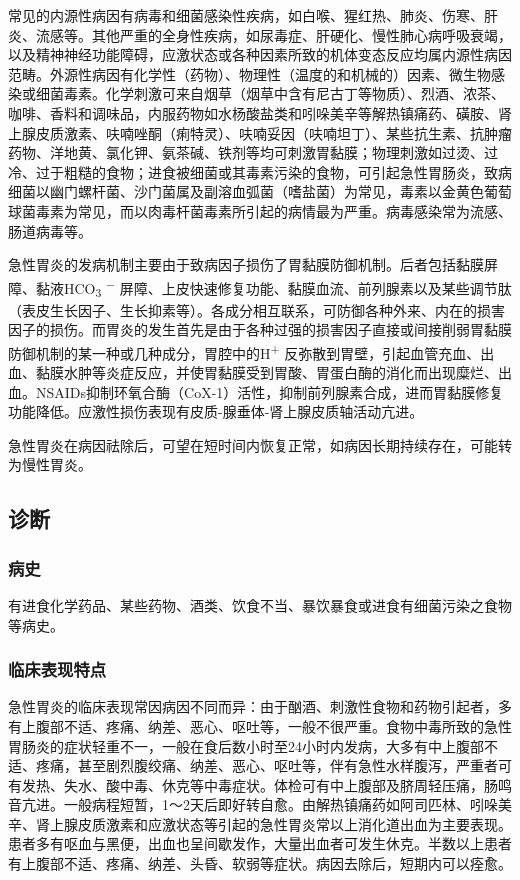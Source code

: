常见的内源性病因有病毒和细菌感染性疾病，如白喉、猩红热、肺炎、伤寒、肝炎、流感等。其他严重的全身性疾病，如尿毒症、肝硬化、慢性肺心病呼吸衰竭，以及精神神经功能障碍，应激状态或各种因素所致的机体变态反应均属内源性病因范畴。外源性病因有化学性（药物）、物理性（温度的和机械的）因素、微生物感染或细菌毒素。化学刺激可来自烟草（烟草中含有尼古丁等物质）、烈酒、浓茶、咖啡、香料和调味品，内服药物如水杨酸盐类和吲哚美辛等解热镇痛药、磺胺、肾上腺皮质激素、呋喃唑酮（痢特灵）、呋喃妥因（呋喃坦丁）、某些抗生素、抗肿瘤药物、洋地黄、氯化钾、氨茶碱、铁剂等均可刺激胃黏膜；物理刺激如过烫、过冷、过于粗糙的食物；进食被细菌或其毒素污染的食物，可引起急性胃肠炎，致病细菌以幽门螺杆菌、沙门菌属及副溶血弧菌（嗜盐菌）为常见，毒素以金黄色葡萄球菌毒素为常见，而以肉毒杆菌毒素所引起的病情最为严重。病毒感染常为流感、肠道病毒等。

急性胃炎的发病机制主要由于致病因子损伤了胃黏膜防御机制。后者包括黏膜屏障、黏液HCO\textsubscript{3}
\textsuperscript{−}
屏障、上皮快速修复功能、黏膜血流、前列腺素以及某些调节肽（表皮生长因子、生长抑素等）。各成分相互联系，可防御各种外来、内在的损害因子的损伤。而胃炎的发生首先是由于各种过强的损害因子直接或间接削弱胃黏膜防御机制的某一种或几种成分，胃腔中的H\textsuperscript{+}
反弥散到胃壁，引起血管充血、出血、黏膜水肿等炎症反应，并使胃黏膜受到胃酸、胃蛋白酶的消化而出现糜烂、出血。NSAIDs抑制环氧合酶（CoX-1）活性，抑制前列腺素合成，进而胃黏膜修复功能降低。应激性损伤表现有皮质-腺垂体-肾上腺皮质轴活动亢进。

急性胃炎在病因祛除后，可望在短时间内恢复正常，如病因长期持续存在，可能转为慢性胃炎。

\subsection{诊断}

\subsubsection{病史}

有进食化学药品、某些药物、酒类、饮食不当、暴饮暴食或进食有细菌污染之食物等病史。

\subsubsection{临床表现特点}

急性胃炎的临床表现常因病因不同而异：由于酗酒、刺激性食物和药物引起者，多有上腹部不适、疼痛、纳差、恶心、呕吐等，一般不很严重。食物中毒所致的急性胃肠炎的症状轻重不一，一般在食后数小时至24小时内发病，大多有中上腹部不适、疼痛，甚至剧烈腹绞痛、纳差、恶心、呕吐等，伴有急性水样腹泻，严重者可有发热、失水、酸中毒、休克等中毒症状。体检可有中上腹部及脐周轻压痛，肠鸣音亢进。一般病程短暂，1～2天后即好转自愈。由解热镇痛药如阿司匹林、吲哚美辛、肾上腺皮质激素和应激状态等引起的急性胃炎常以上消化道出血为主要表现。患者多有呕血与黑便，出血也呈间歇发作，大量出血者可发生休克。半数以上患者有上腹部不适、疼痛、纳差、头昏、软弱等症状。病因去除后，短期内可以痊愈。

